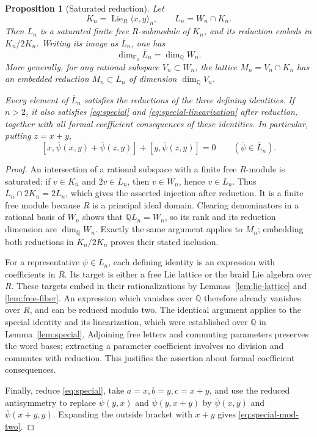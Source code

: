 \documentclass[11pt]{article}
\newcommand{\Q}{\mathbb Q}
\newcommand{\F}{{\mathbb F_2}}
\newcommand{\Lie}{\operatorname{Lie}}
\newtheorem{proposition}[theorem]{Proposition}
\theoremstyle{definition}
\theoremstyle{remark}
\numberwithin{equation}{section}
\begin{document}
\begin{proposition}[Saturated reduction]\label{prop:saturated-reduction}
Let
\[
 K_n=\Lie_R\langle x,y\rangle_n,
 \qquad L_n=W_n\cap K_n.
\]
Then \(L_n\) is a saturated finite free \(R\)-submodule of \(K_n\),
and its reduction embeds in \(K_n/2K_n\).  Writing its image as
\(\overline L_n\), one has
\begin{equation}\label{eq:saturated-dimension}
 \dim_{\F}\overline L_n=\dim_{\Q}W_n.
\end{equation}
More generally, for any rational subspace \(V_n\subset W_n\), the
lattice \(M_n=V_n\cap K_n\) has an embedded reduction
\(\overline M_n\subset\overline L_n\) of dimension
\(\dim_{\Q}V_n\).

Every element of \(\overline L_n\) satisfies the reductions of the
three defining identities.  If \(n>2\), it also satisfies
\eqref{eq:special} and \eqref{eq:special-linearization} after
reduction, together with all formal coefficient consequences of
these identities.  In particular, putting \(z=x+y\),
\begin{equation}\label{eq:special-mod-two}
 [x,\overline\psi(x,y)+\overline\psi(z,y)]
       +[y,\overline\psi(z,y)]=0
 \qquad(\overline\psi\in\overline L_n).
\end{equation}
\end{proposition}
\begin{proof}
An intersection of a rational subspace with a finite free
\(R\)-module is saturated: if \(v\in K_n\) and \(2v\in L_n\),
then \(v\in W_n\), hence \(v\in L_n\).  Thus
\(L_n\cap2K_n=2L_n\), which gives the asserted injection after
reduction.  It is a finite free module because \(R\) is a principal
ideal domain.  Clearing denominators in a rational basis of
\(W_n\) shows that \(\Q L_n=W_n\), so its rank and its reduction
dimension are \(\dim_{\Q}W_n\).  Exactly the same argument applies
to \(M_n\); embedding both reductions in \(K_n/2K_n\) proves their
stated inclusion.

For a representative \(\psi\in L_n\), each defining identity is
an expression with coefficients in \(R\).  Its target is either a
free Lie lattice or the braid Lie algebra over \(R\).  These targets
embed in their rationalizations by Lemmas~\ref{lem:lie-lattice} and
\ref{lem:free-fiber}.  An expression which vanishes over \(\Q\)
therefore already vanishes over \(R\), and can be reduced modulo
two.  The identical argument applies to the special identity and
its linearization, which were established over \(\Q\) in
Lemma~\ref{lem:special}.  Adjoining free letters and commuting
parameters preserves the word bases; extracting a parameter
coefficient involves no division and commutes with reduction.
This justifies the assertion about formal coefficient consequences.

Finally, reduce \eqref{eq:special}, take \(a=x,b=y,c=x+y\), and
use the reduced antisymmetry to replace \(\overline\psi(y,x)\)
and \(\overline\psi(y,x+y)\) by
\(\overline\psi(x,y)\) and \(\overline\psi(x+y,y)\).
Expanding the outside bracket with \(x+y\) gives
\eqref{eq:special-mod-two}.
\end{proof}
\end{document}
